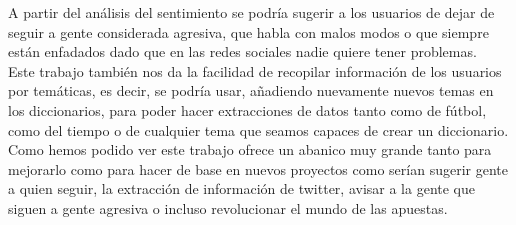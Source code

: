 \documentclass[../all.tex]{subfiles}
\begin{document}
	A partir del análisis del sentimiento se podría sugerir a los usuarios de dejar de seguir a gente considerada agresiva, que habla con malos modos o que siempre están enfadados dado que en las redes sociales nadie quiere tener problemas.\\
	
	Este trabajo también nos da la facilidad de recopilar información de los usuarios por temáticas, es decir, se podría usar, añadiendo nuevamente nuevos temas en los diccionarios, para poder hacer extracciones de datos tanto como de fútbol, como del tiempo o de cualquier tema que seamos capaces de crear un diccionario.\\
	
	Como hemos podido ver este trabajo ofrece un abanico muy grande tanto para mejorarlo como para hacer de base en nuevos proyectos como serían sugerir gente a quien seguir, la extracción de información de twitter, avisar a la gente que siguen a gente agresiva o incluso revolucionar el mundo de las apuestas.
\end{document}
